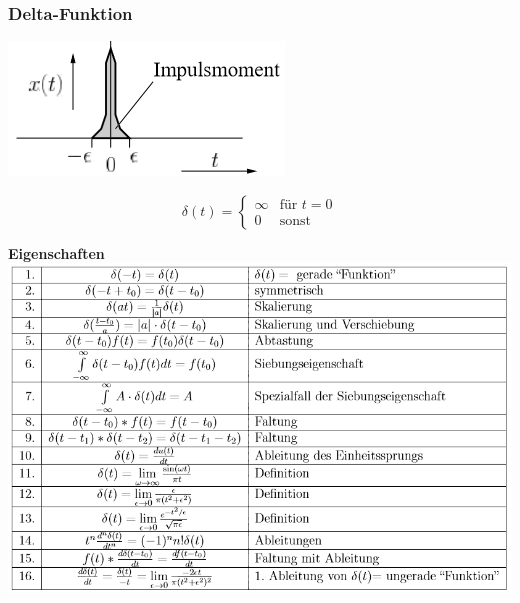 \subsubsection{Delta-Funktion}
\begin{center}
	\begin{minipage}{0.2\textwidth}
		\includegraphics[width=\linewidth,keepaspectratio=true]{Images/dirac}
	\end{minipage}%
	\begin{minipage}{0.2\textwidth}
		\[\delta(t) = \begin{cases*}
			\infty & \text{für } t = 0 \\
			0 & \text{sonst}
		\end{cases*}\]
	\end{minipage}
\end{center}

\textbf{Eigenschaften}\\
\includegraphics[width=\columnwidth]{Images/delta}

